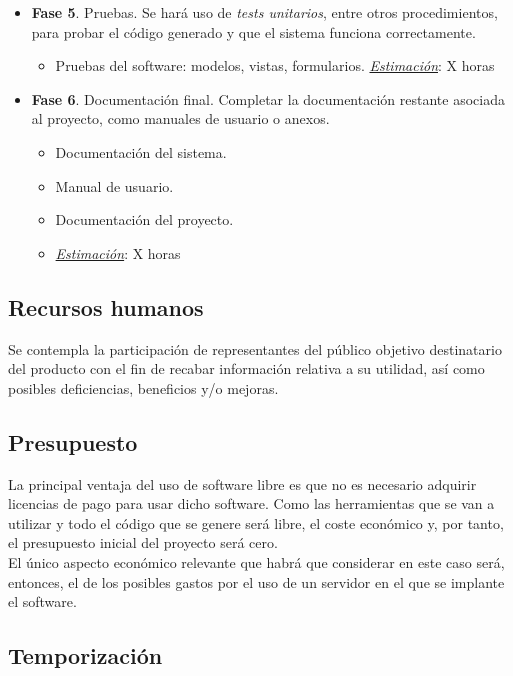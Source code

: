 \begin{itemize}
	\item \textbf{Fase 5}. Pruebas. Se hará uso de \textit{tests unitarios}, entre otros procedimientos, para probar el código generado y que el sistema funciona correctamente.
	\begin{itemize}
		\item Pruebas del software: modelos, vistas, formularios.
 \underline{\textit{Estimación}}: X horas
	\end{itemize}
	
	\item \textbf{Fase 6}. Documentación final. Completar la documentación restante asociada al proyecto, como manuales de usuario o anexos.
	\begin{itemize}
		\item Documentación del sistema.
		\item Manual de usuario.
		\item Documentación del proyecto.
		\item \underline{\textit{Estimación}}: X horas
	\end{itemize}
\end{itemize}

\subsection{Recursos humanos}

Se contempla la participación de representantes del público objetivo destinatario del producto con el fin de recabar información relativa a su utilidad, así como posibles deficiencias, beneficios y/o mejoras.

\subsection{Presupuesto}

La principal ventaja del uso de software libre es que no es necesario adquirir licencias de pago para usar dicho software. Como las herramientas que se van a utilizar y todo el código que se genere será libre, el coste económico y, por tanto, el presupuesto inicial del proyecto será cero.\\

El único aspecto económico relevante que habrá que considerar en este caso será, entonces, el de los posibles gastos por el uso de un servidor en el que se implante el software.

\subsection{Temporización}

